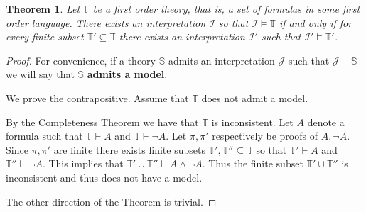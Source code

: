 \documentclass[12pt]{article}
\theoremstyle{plain}
\newtheorem{thm}{Theorem}[subsection] %
\theoremstyle{definition}
\newcommand{\bb}[1]{\mathbb{#1}}
\newcommand{\call}[1]{\mathcal{#1}}
\begin{document}
	\begin{thm}
		Let $\bb{T}$ be a first order theory, that is, a set of formulas in some first order language. There exists an interpretation $\call{I}$ so that $\call{I} \models \bb{T}$ if and only if for every finite subset $\bb{T}' \subseteq \bb{T}$ there exists an interpretation $\call{I}'$ such that $\call{I}' \models \bb{T}'$.
		\end{thm}
	\begin{proof}
		For convenience, if a theory $\bb{S}$ admits an interpretation $\call{J}$ such that $\call{J} \models \bb{S}$ we will say that $\bb{S}$ \textbf{admits a model}.
		
		We prove the contrapositive. Assume that $\bb{T}$ does not admit a model.
		
		By the Completeness Theorem we have that $\bb{T}$ is inconsistent. Let $A$ denote a formula such that $\bb{T} \vdash A$ and $\bb{T} \vdash \neg A$. Let $\pi, \pi'$ respectively be proofs of $A, \neg A$. Since $\pi, \pi'$ are finite there exists finite subsets $\bb{T}',\bb{T}'' \subseteq \bb{T}$ so that $\bb{T}' \vdash A$ and $\bb{T}'' \vdash \neg A$. This implies that $\bb{T}' \cup \bb{T}'' \vdash A \wedge \neg A$. Thus the finite subset $\bb{T}' \cup \bb{T}''$ is inconsistent and thus does not have a model.
		
		The other direction of the Theorem is trivial.
		\end{proof}
	
\end{document}
